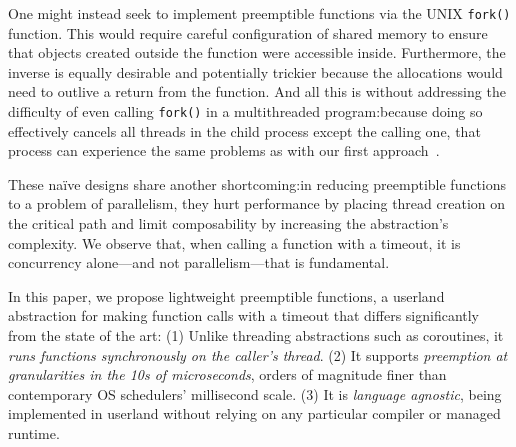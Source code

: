 One might instead seek to implement preemptible functions via the UNIX
\texttt{fork()} function.  This would require careful configuration of shared memory
to ensure that objects created outside the function were accessible inside.
Furthermore, the inverse is equally desirable and potentially trickier because the
allocations would need to outlive a return from the function.  And all this is
without addressing the difficulty of even calling \texttt{fork()} in a multithreaded
program:\@ because doing so effectively cancels all threads in the child process
except the calling one, that process can experience the same problems as with our
first approach~\cite{baumann:hotos2019}.

These na\"ive designs share another shortcoming:\@ in reducing
preemptible functions to a problem of parallelism, they hurt performance by placing
thread creation on the critical path and limit composability by increasing the
abstraction's complexity.  We observe that, when calling a function with
a timeout, it is concurrency alone---and not parallelism---that is fundamental.

In this paper, we propose lightweight preemptible functions, a userland abstraction
for making function calls with a timeout that differs significantly from the state of
the art:  (1) Unlike threading abstractions such as coroutines, it \textit{runs
functions synchronously on the caller's thread}.  (2) It supports \textit{preemption
at granularities in the 10s of microseconds}, orders of magnitude finer than
contemporary OS schedulers' millisecond scale.  (3) It is \textit{language agnostic},
being implemented in userland without relying on any particular compiler or managed
runtime.
